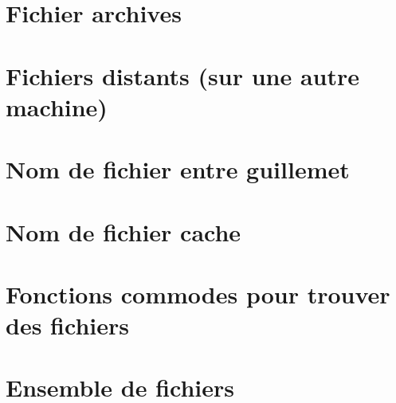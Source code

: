 \section{Fichier archives}\label{chap15sec12}
\section{Fichiers distants (sur une autre machine)}\label{chap15sec13}
\section{Nom de fichier entre guillemet}\label{chap15sec14}
\section{Nom de fichier cache}\label{chap15sec15}
\section{Fonctions commodes pour trouver des fichiers}\label{chap15sec16}
\section{Ensemble de fichiers}\label{chap15sec17}